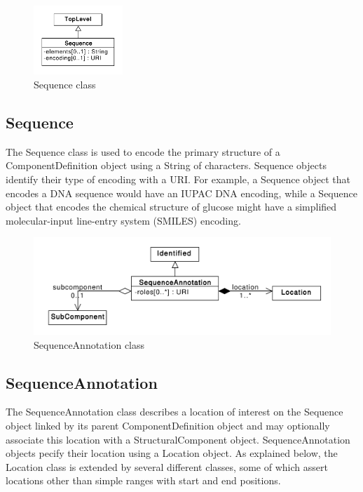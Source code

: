 \documentclass[draftspec]{sbmlpkgspec}
\begin{document}
\begin{figure}[h]
\begin{center}
\includegraphics[width=0.3\textwidth]{uml/sequence}
\caption[]{Sequence class}
\label{uml:sequence}
\end{center}
\end{figure}

\subsection{Sequence}

The Sequence class is used to encode the primary structure of a ComponentDefinition object using a String of characters. Sequence objects identify their type of encoding with a URI. For example, a Sequence object that encodes a DNA sequence would have an IUPAC DNA encoding, while a Sequence object that encodes the chemical structure of glucose might have a simplified molecular-input line-entry system (SMILES) encoding. 

\begin{figure}[h]
\begin{center}
\includegraphics[width=\textwidth]{uml/sequence_annotation}
\caption[]{SequenceAnnotation class}
\label{uml:sequence_annotation}
\end{center}
\end{figure}

\subsection{SequenceAnnotation}

The SequenceAnnotation class describes a location of interest on the Sequence object linked by its parent ComponentDefinition object and may optionally associate this location with a StructuralComponent object. SequenceAnnotation objects pecify their location using a Location object. As explained below, the Location class is extended by several different classes, some of which assert locations other than simple ranges with start and end positions.
\end{document}
